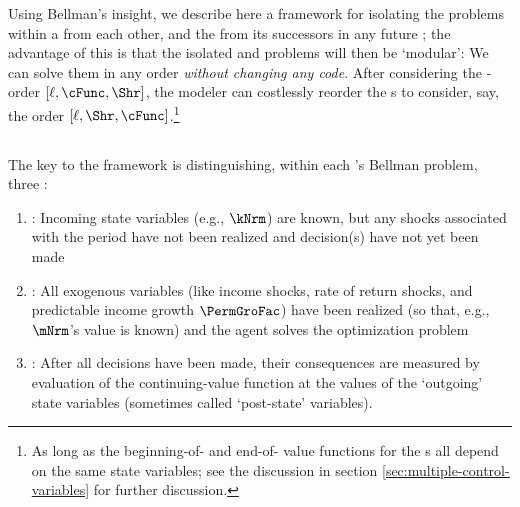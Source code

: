 \documentclass[\econtexRoot/SolvingMicroDSOPs]{subfiles}
\begin{document}
Using Bellman's insight, we describe here a framework for isolating the {\stg} problems within a {\interval} from each other, and the {\interval} from its successors in any future {\interval}; the advantage of this is that the isolated {\stg} and {\interval} problems will then be `modular': We can solve them in any order \textit{without changing any code}. After considering the {\stg}-order $[\ell,\cFunc,\Shr]$, the modeler can costlessly reorder the {\stg}s to consider, say, the order $[\ell,\Shr,\cFunc]$.\footnote{As long as the beginning-of-{\stg} and end-of-{\stg} value functions for the {\stg}s all depend on the same state variables; see the discussion in section \ref{sec:multiple-control-variables} for further discussion.}

\subsection{\Moves}

The key to the framework is distinguishing, within each {\stg}'s Bellman problem, three {\moves}:

\begin{enumerate}
\item \textbf{\Arrival}: Incoming state variables (e.g., $\kNrm$) are known, but any shocks associated with the period have not been realized and decision(s) have not yet been made
\item \textbf{\Decision}: All exogenous variables (like income shocks, rate of return shocks, and predictable income growth $\PermGroFac$) have been realized (so that, e.g., $\mNrm$'s value is known) and the agent solves the optimization problem
\item \textbf{\Continuation}: After all decisions have been made, their consequences are measured by evaluation of the continuing-value function at the values of the `outgoing' state variables (sometimes called `post-state' variables).
\end{enumerate}

\end{document}
